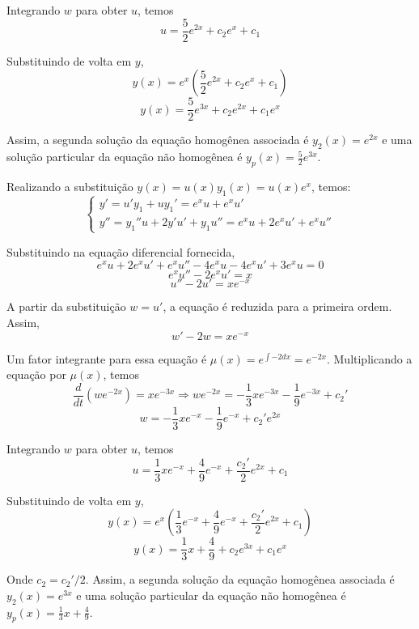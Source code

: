 \documentclass[oneside,12pt,a4paper]{report}
\begin{document}
\begin{resolucao}
    Integrando $w$ para obter $u$, temos
    \[u=\frac{5}{2}e^{2x}+c_2e^{x}+c_1\]

    Substituindo de volta em $y$,
    \[y(x)=e^{x}\left(\frac{5}{2}e^{2x}+c_2e^{x}+c_1\right)\]
    \[y(x)=\frac{5}{2}e^{3x}+c_2e^{2x}+c_1e^{x}\]

    Assim, a segunda solução da equação homogênea associada é $\boxed{y_2(x)=e^{2x}}$ e uma solução particular da equação não homogênea é $\boxed{y_p(x)=\frac{5}{2}e^{3x}}$.

    \itemresolucao Realizando a substituição $y(x)=u(x)y_1(x)=u(x)e^{x}$, temos:
    \[\begin{cases}
        y'=u'y_1+uy_1'=e^{x}u+e^{x}u'\\
        y''=y_1''u+2y'u'+y_1u''=e^{x}u+2e^{x}u'+e^{x}u''
    \end{cases}\]

    Substituindo na equação diferencial fornecida, 
    \[e^{x}u+2e^{x}u'+e^{x}u''-4e^{x}u-4e^{x}u'+3e^{x}u=0\]
    \[e^xu''-2e^xu'=x\]
    \[u''-2u'=xe^{-x}\]

    A partir da substituição $w=u'$, a equação é reduzida para a primeira ordem. Assim,
    \[w'-2w=xe^{-x}\]

    Um fator integrante para essa equação é $\mu(x)=e^{\int -2dx}=e^{-2x}$. Multiplicando a equação por $\mu(x)$, temos
    \[\frac{d}{dt}\left(we^{-2x}\right)=xe^{-3x}\Rightarrow we^{-2x}=-\frac{1}{3}xe^{-3x}-\frac{1}{9}e^{-3x}+c_2'\]
    \[w=-\frac{1}{3}xe^{-x}-\frac{1}{9}e^{-x}+c_2'e^{2x}\]

    Integrando $w$ para obter $u$, temos
    \[u=\frac{1}{3}xe^{-x}+\frac{4}{9}e^{-x}+\frac{c_2'}{2}e^{2x}+c_1\]

    Substituindo de volta em $y$,
    \[y(x)=e^{x}\left(\frac{1}{3}e^{-x}+\frac{4}{9}e^{-x}+\frac{c_2'}{2}e^{2x}+c_1\right)\]
    \[y(x)=\frac{1}{3}x+\frac{4}{9}+c_2e^{3x}+c_1e^{x}\]

    Onde $c_2=c_2'/2$. Assim, a segunda solução da equação homogênea associada é $\boxed{y_2(x)=e^{3x}}$ e uma solução particular da equação não homogênea é $\boxed{y_p(x)=\frac{1}{3}x+\frac{4}{9}}$.
\end{resolucao}
\end{document}
